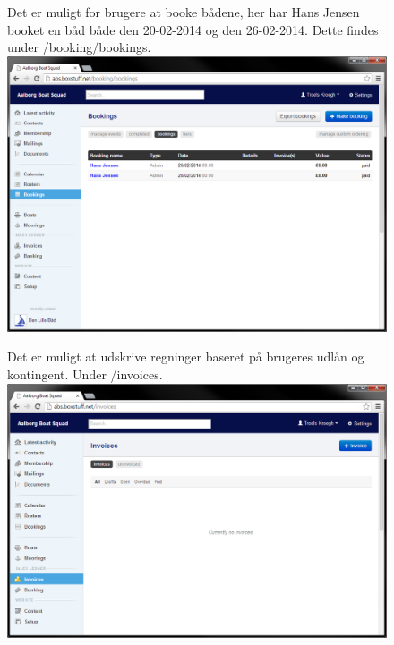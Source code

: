 \begin{figure}
	Det er muligt for brugere at booke bådene, her har Hans Jensen booket en båd både den 20-02-2014 og den 26-02-2014. Dette findes under /booking/bookings.\newline
	\includegraphics[scale=0.5]{images/teknologi/_Bookings}
\end{figure}

\begin{figure}
	Det er muligt at udskrive regninger baseret på brugeres udlån og kontingent. Under /invoices.\newline
	\includegraphics[scale=0.5]{images/teknologi/_Invoices}
\end{figure}

